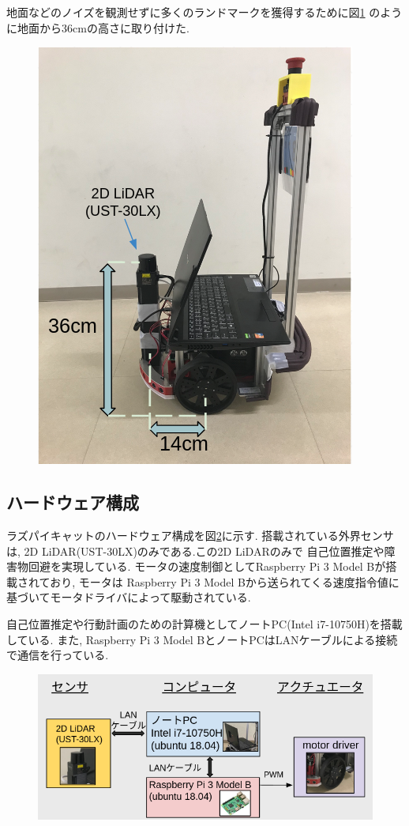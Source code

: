 地面などのノイズを観測せずに多くのランドマークを獲得するために図\ref{fig:raspicat-lidar}
のように地面から36cmの高さに取り付けた.

\begin{figure}[H]
	\begin{center}
		\includegraphics[width=0.5\linewidth]{figs/raspicat-lidar.png}
		\caption{}
		\label{fig:raspicat-lidar}
	\end{center}
\end{figure}

\subsection{ハードウェア構成}
ラズパイキャットのハードウェア構成を図\ref{fig:raspicat-hardware-config}に示す. 
搭載されている外界センサは, 2D LiDAR(UST-30LX)のみである.この2D LiDARのみで
自己位置推定や障害物回避を実現している. 
モータの速度制御としてRaspberry Pi 3 Model Bが搭載されており, モータは
Raspberry Pi 3 Model Bから送られてくる速度指令値に基づいてモータドライバによって駆動されている.

自己位置推定や行動計画のための計算機としてノートPC(Intel i7-10750H)を搭載している.
また, Raspberry Pi 3 Model BとノートPCはLANケーブルによる接続で通信を行っている.

\begin{figure}[H]
	\begin{center}
		\includegraphics[width=1.0\linewidth]{figs/raspicat-hardware-config.png}
		\caption{}
		\label{fig:raspicat-hardware-config}
	\end{center}
\end{figure}


